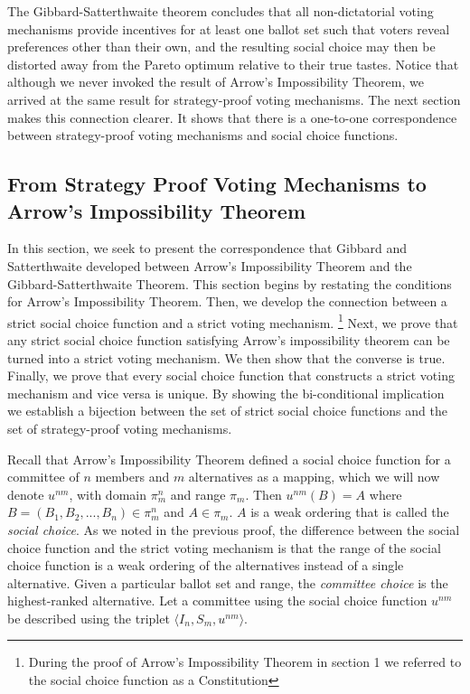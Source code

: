 \documentclass{amsart}
\theoremstyle{plain}
\begin{document}
The Gibbard-Satterthwaite theorem concludes that all non-dictatorial voting mechanisms provide incentives for at least one ballot set such that voters reveal preferences other than their own, and the resulting social choice may then be distorted away from the Pareto optimum relative to their true tastes. Notice that although we never invoked the result of Arrow's Impossibility Theorem, we arrived at the same result for strategy-proof voting mechanisms. The next section makes this connection clearer. It shows that there is a one-to-one correspondence between strategy-proof voting mechanisms and social choice functions.

\subsection{From Strategy Proof Voting Mechanisms to Arrow's Impossibility Theorem}

In this section, we seek to present the correspondence that Gibbard and Satterthwaite developed between Arrow's Impossibility Theorem and the Gibbard-Satterthwaite Theorem. This section begins by restating the conditions for Arrow's Impossibility Theorem. Then, we develop the connection between a strict social choice function and a strict voting mechanism. \footnote{During the proof of Arrow's Impossibility Theorem in section 1 we referred to the social choice function as a Constitution} Next, we prove that any strict social choice function satisfying Arrow's impossibility theorem can be turned into a strict voting mechanism. We then show that the converse is true. Finally, we prove that every social choice function that constructs a strict voting mechanism and vice versa is unique. By showing the bi-conditional implication we establish a bijection between the set of strict social choice functions and the set of strategy-proof voting mechanisms.

Recall that Arrow's Impossibility Theorem defined a social choice function for a committee of $n$ members and $m$ alternatives as a mapping, which we will now denote $u^{nm}$, with domain $\pi_m^n$ and range $\pi_m$. Then $u^{nm}(B) = A$ where $B = (B_1, B_2, ... , B_n) \in \pi_m^n$ and $A \in \pi_m$. $A$ is a weak ordering that is called the \emph{social choice}. As we noted in the previous proof, the difference between the social choice function and the strict voting mechanism is that the range of the social choice function is a weak ordering of the alternatives instead of a single alternative. Given a particular ballot set and range, the \emph{committee choice} is the highest-ranked alternative. Let a committee using the social choice function $u^{nm}$ be described using the triplet $\langle I_n, S_m, u^{nm} \rangle$.
\end{document}
